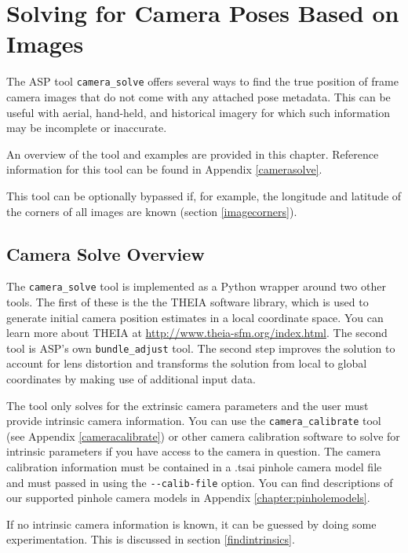 \chapter{Solving for Camera Poses Based on Images}
\label{ch:sfm}

The ASP tool \texttt{camera\_solve} offers several ways
to find the true position of frame camera images that do
not come with any attached pose metadata. This can be useful with
aerial, hand-held, and historical imagery for which such information
may be incomplete or inaccurate.

An overview of the tool and examples are provided in this chapter.
Reference information for this tool can be found in Appendix
\ref{camerasolve}.

This tool can be optionally bypassed if, for example, the longitude and latitude of
the corners of all images are known (section \ref{imagecorners}). 

\section{Camera Solve Overview}

The \texttt{camera\_solve} tool is implemented as a Python wrapper around
two other tools.  The first of these is the the THEIA software library,
which is used to generate initial camera position estimates in a local
coordinate space.  You can learn more about THEIA at
\url{http://www.theia-sfm.org/index.html}.  The second tool is ASP's
own \texttt{bundle\_adjust} tool.  The second step improves the solution
to account for lens distortion and transforms the solution from local
to global coordinates by making use of additional input data.

The tool only solves for the extrinsic camera parameters
and the user must provide intrinsic camera information.
You can use the \texttt{camera\_calibrate}
tool (see Appendix \ref{cameracalibrate}) or other camera calibration software
to solve for intrinsic parameters if you have access to the camera in question.
The camera calibration information must be contained in a
.tsai pinhole camera model file and must passed in using the
\texttt{-\/-calib-file} option.  You can find descriptions of
our supported pinhole camera models in Appendix \ref{chapter:pinholemodels}.

If no intrinsic camera information is known, it can be guessed by doing some experimentation.
This is discussed in section \ref{findintrinsics}.

